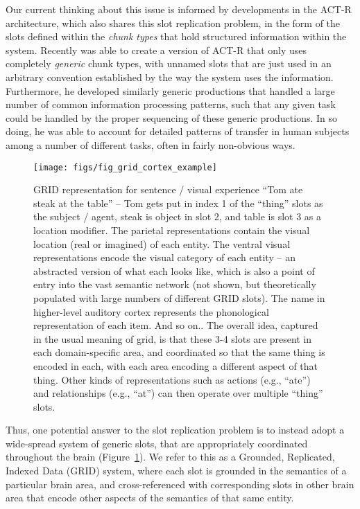 \documentclass[11pt,twoside]{article}
\newif\myifpdf
\begin{document}
Our current thinking about this issue is informed by developments in the ACT-R architecture, which also shares this slot replication problem, in the form of the slots defined within the {\em chunk types} that hold structured information within the system.  Recently  was able to create a version of ACT-R that only uses completely {\em generic} chunk types, with unnamed slots that are just used in an arbitrary convention established by the way the system uses the information.  Furthermore, he developed similarly generic productions that handled a large number of common information processing patterns, such that any given task could be handled by the proper sequencing of these generic productions.  In so doing, he was able to account for detailed patterns of transfer in human subjects among a number of different tasks, often in fairly non-obvious ways.

\begin{figure}
  \centering\texttt{[image: figs/fig\_grid\_cortex\_example]}
  \caption{\small GRID representation for sentence / visual experience ``Tom ate steak at the table'' -- Tom gets put in index 1 of the ``thing'' slots as the subject / agent, steak is object in slot 2, and table is slot 3 as a location modifier. The parietal representations contain the visual location (real or imagined) of each entity. The ventral visual representations encode the visual category of each entity -- an abstracted version of what each looks like, which is also a point of entry into the vast semantic network (not shown, but theoretically populated with large numbers of different GRID slots). The name in higher-level auditory cortex represents the phonological representation of each item. And so on.. The overall idea, captured in the usual meaning of grid, is that these 3-4 slots are present in each domain-specific area, and coordinated so that the same thing is encoded in each, with each area encoding a different aspect of that thing.  Other kinds of representations such as actions (e.g., ``ate'') and relationships (e.g., ``at'') can then  operate over multiple ``thing'' slots.}
  \label{fig.grid}
\end{figure}

Thus, one potential answer to the slot replication problem is to instead adopt a wide-spread system of generic slots, that are appropriately coordinated throughout the brain (Figure~\ref{fig.grid}).  We refer to this as a Grounded, Replicated, Indexed Data (GRID) system, where each slot is grounded in the semantics of a particular brain area, and cross-referenced with corresponding slots in other brain area that encode other aspects of the semantics of that same entity.
\end{document}
